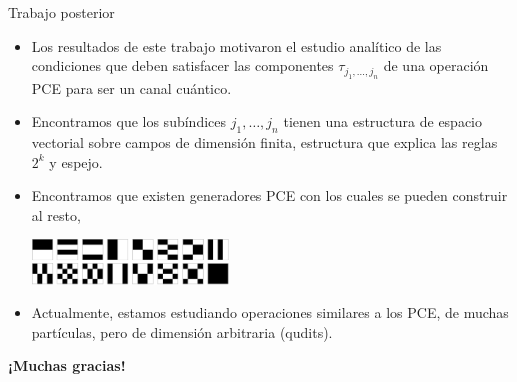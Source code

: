 \documentclass[xcolor=dvipsnames,presentation]{beamer}%
\begin{document}
\begin{frame}{Trabajo posterior}
	\begin{itemize}
	\item Los resultados de este trabajo motivaron el estudio analítico de las 
	condiciones que deben satisfacer las componentes $\tau_{j_1,\ldots,j_n}$ 
	de una operación PCE para ser un canal cuántico.
	\item Encontramos que los subíndices $j_1,\ldots,j_n$ tienen una estructura 
	de espacio vectorial sobre campos de dimensión finita, estructura que explica
	las reglas $2^k$ y espejo.
	\item Encontramos que existen generadores PCE con los cuales se pueden
	construir al resto, 
		\vspace*{1mm}\begin{center}
		\includegraphics[height=12mm]{portada}
		\end{center}
		\item Actualmente, estamos estudiando operaciones similares a los PCE,
		de muchas partículas, pero de dimensión arbitraria (qudits). 
	\end{itemize}\vfill 
	\hfill \Large \bf ¡Muchas gracias!
\end{frame}
\end{document}
